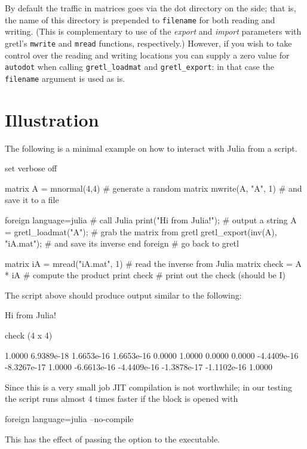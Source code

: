 By default the traffic in matrices goes via the dot directory on the
 side; that is, the name of this directory is prepended to
\texttt{filename} for both reading and writing. (This is complementary
to use of the \textsl{export} and \textsl{import} parameters with
gretl's \texttt{mwrite} and \texttt{mread} functions,
respectively.) However, if you wish to take control over the reading
and writing locations you can supply a zero value for
\texttt{autodot} when calling \verb|gretl_loadmat| and
\verb|gretl_export|: in that case the \texttt{filename} argument is
used as is.

\section{Illustration}

The following is a minimal example on how to interact with Julia from a
 script.

\begin{code}
set verbose off

matrix A = mnormal(4,4)                # generate a random matrix
mwrite(A, "A", 1)                      # and save it to a file

foreign language=julia                 # call Julia
    print("Hi from Julia!\n");         # output a string
    A = gretl_loadmat("A");            # grab the matrix from gretl
    gretl_export(inv(A), "iA.mat");    # and save its inverse
end foreign                            # go back to gretl

matrix iA = mread("iA.mat", 1)         # read the inverse from Julia
matrix check = A * iA                  # compute the product
print check                            # print out the check (should be I)
\end{code}

The script above should produce output similar to the following:
\begin{code}
Hi from Julia!

check (4 x 4)

      1.0000   6.9389e-18   1.6653e-16   1.6653e-16 
      0.0000       1.0000       0.0000       0.0000 
 -4.4409e-16  -8.3267e-17       1.0000  -6.6613e-16 
 -4.4409e-16  -1.3878e-17  -1.1102e-16       1.0000 
\end{code}

Since this is a very small job JIT compilation is not worthwhile; in
our testing the script runs almost 4 times faster if the 
block is opened with
\begin{code}
foreign language=julia --no-compile
\end{code}
This has the effect of passing the option  to the
 executable.



